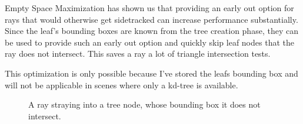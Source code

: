 
Empty Space Maximization has shown us that providing an early out option for
rays that would otherwise get sidetracked can increase performance
substantially. 
Since the leaf's bounding boxes are known from the tree creation phase, they can
be used to provide such an early out option and quickly skip leaf nodes that the
ray does not intersect. This saves a ray a lot of triangle intersection tests.

This optimization is only possible because I've stored the leafs bounding box
and will not be applicable in scenes where only a kd-tree is available. 


\begin{figure}
  \centering
  \caption{A ray straying into a tree node, whose bounding box it does
    not intersect.}
  \label{fig:waywardRay}
\end{figure}





